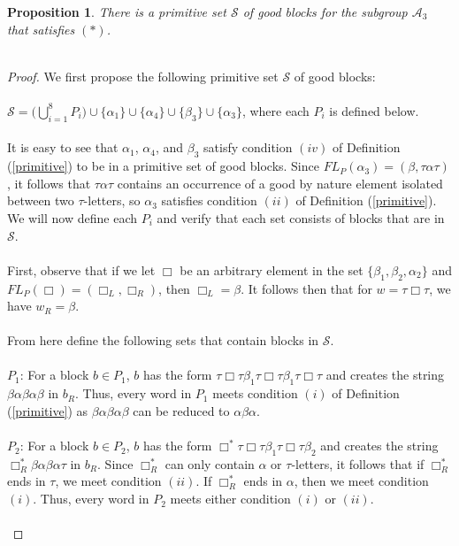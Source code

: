 \documentclass[11pt]{amsart}
\newtheorem{proposition}[theorem]{Proposition}
\theoremstyle{definition}
\theoremstyle{remark}
\numberwithin{equation}{section}
\begin{document}
\begin{proposition}
There is a primitive set $\mathcal{S}$ of good blocks for the subgroup $\mathcal{A}_3$ that satisfies $(*)$. \\ \\
\end{proposition}
\begin{proof}
We first propose the following primitive set $\mathcal{S}$ of good blocks: \\ \\
$\mathcal{S} = \Bigg(\displaystyle{ \bigcup_{i=1}^{8}P_{i}} \Bigg)\cup\{\alpha_{1} \}\cup \{\alpha_{4} \}\cup \{\beta_{3} \}\cup \{\alpha_{3} \}$, where each $P_{i}$ is defined below.\\ \\
It is easy to see that $\alpha_{1}$, $\alpha_{4}$, and $\beta_{3}$ satisfy condition $(iv)$ of Definition (\ref{primitive}) to be in a primitive set of good blocks. Since $FL_{P}(\alpha_{3}) = (\beta, \tau \alpha \tau)$, it follows that $\tau \alpha \tau$ contains an occurrence of a good by nature element isolated between two $\tau$-letters, so $\alpha_{3}$ satisfies condition $(ii)$ of Definition (\ref{primitive}). We will now define each $P_{i}$ and verify that each set consists of blocks that are in $\mathcal{S}$. \\ \\
First, observe that if we let $\Box$ be an arbitrary element in the set $\{ \beta_{1}, \beta_{2}, \alpha_{2} \}$ and $FL_{P}(\Box) = (\Box_{L}, \Box_{R})$, then $\Box_{L} = \beta$. It follows then that for $w = \tau \Box \tau$, we have $w_{R} = \beta$. \\ \\
From here define the following sets that contain blocks in $\mathcal{S}$. \\ \\  
\underline{$P_{1}$}: For a block $b \in P_{1}$, $b$ has the form $\tau \Box \tau \beta_{1} \tau \Box \tau \beta_{1} \tau \Box \tau$ and creates the string $\beta \alpha \beta \alpha \beta$ in $b_{R}$. Thus, every word in $P_{1}$ meets condition $(i)$ of Definition (\ref{primitive}) as $\beta \alpha \beta \alpha \beta$ can be reduced to $\alpha \beta \alpha$. \\ \\
\underline{$P_{2}$}: For a block $b \in P_{2}$, $b$ has the form $\Box^{*} \tau \Box \tau \beta_{1} \tau \Box \tau \beta_{2}$ and creates the string $\Box^{*}_{R} \beta \alpha \beta \alpha \tau$ in $b_{R}$. Since $\Box^{*}_{R}$ can only contain $\alpha$ or $\tau$-letters, it follows that if $\Box^{*}_{R}$ ends in $\tau$, we meet condition $(ii)$. If  $\Box^{*}_{R}$ ends in $\alpha$, then we meet condition $(i)$. Thus, every word in $P_{2}$ meets either condition $(i)$ or $(ii)$. \\ \\

\end{proof}
\end{document}
